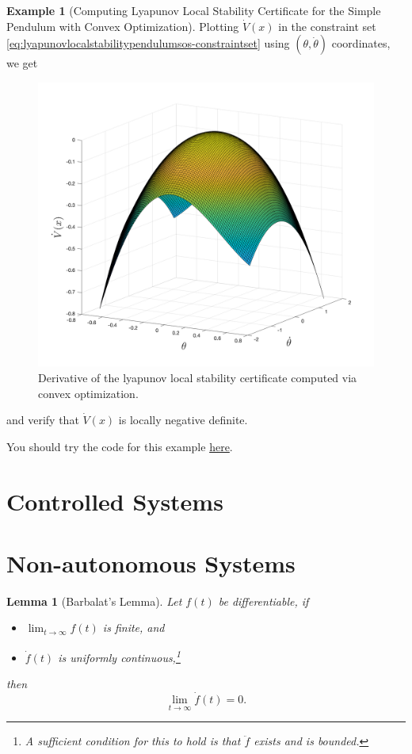 \documentclass[
]{book}
\newtheorem{lemma}{Lemma}[chapter]
\theoremstyle{definition}
\theoremstyle{definition}
\newtheorem{example}{Example}[chapter]
\theoremstyle{definition}
\theoremstyle{definition}
\theoremstyle{remark}
\begin{document}
\begin{example}[Computing Lyapunov Local Stability Certificate for the Simple Pendulum with Convex Optimization]
Plotting \(\dot{V}(x)\) in the constraint set \eqref{eq:lyapunovlocalstabilitypendulumsos-constraintset} using \((\theta, \dot{\theta})\) coordinates, we get

\begin{figure}

{\centering \includegraphics[width=0.6\linewidth]{images/pendulum-local-lyapunov-certificate-Vdot} 

}

\caption{Derivative of the lyapunov local stability certificate computed via convex optimization.}\label{fig:lyapunov-local-certificate-pendulum-Vdot}
\end{figure}

and verify that \(\dot{V}(x)\) is locally negative definite.

You should try the code for this example \href{https://github.com/ComputationalRobotics/OptimalControlEstimation-Examples/blob/main/pendulum_local_lyapunov_certificate.m}{here}.
\end{example}

\hypertarget{controlled-systems}{%
\section{Controlled Systems}\label{controlled-systems}}

\hypertarget{non-autonomous-systems}{%
\section{Non-autonomous Systems}\label{non-autonomous-systems}}

\begin{lemma}[Barbalat's Lemma]
\protect\hypertarget{lem:Barbalat}{}\label{lem:Barbalat}Let \(f(t)\) be differentiable, if

\begin{itemize}
\item
  \(\lim_{t \rightarrow \infty} f(t)\) is finite, and
\item
  \(\dot{f}(t)\) is uniformly continuous,\footnote{A sufficient condition for this to hold is that \(\ddot{f}\) exists and is bounded.}
\end{itemize}

then
\[
\lim_{t \rightarrow \infty} \dot{f}(t) = 0.
\]
\end{lemma}
\end{document}
